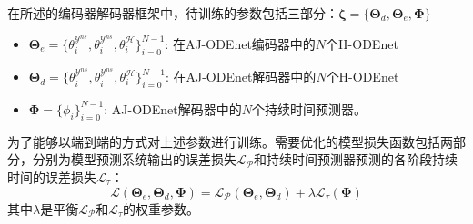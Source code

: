 在所述的编码器解码器框架中，待训练的参数包括三部分：$\boldsymbol \zeta=\{\boldsymbol{\Theta}_d, \boldsymbol{\Theta}_e,\boldsymbol{\Phi}\}$
\begin{itemize}
    \item $\boldsymbol{\Theta}_e=\{\theta_i^{\mathcal{Y}^{ns}},\theta_i^{\mathcal{Y}^{ns}},\theta_i^{\mathcal{H}}\}_{i=0}^{N-1}$: 在AJ-ODEnet编码器中的$N$个H-ODEnet 
    \item $\boldsymbol{\Theta}_d=\{\theta_i^{\mathcal{Y}^{ns}},\theta_i^{\mathcal{Y}^{ns}},\theta_i^{\mathcal{H}}\}_{i=0}^{N-1}$: 在AJ-ODEnet解码器中的$N$个H-ODEnet 
    \item $\boldsymbol{\Phi}=\{\phi_i\}_{i=0}^{N-1}$:  AJ-ODEnet解码器中的$N$个持续时间预测器。
\end{itemize}
为了能够以端到端的方式对上述参数进行训练。需要优化的模型损失函数包括两部分，分别为模型预测系统输出的误差损失$\mathcal{L_P}$和持续时间预测器预测的各阶段持续时间的误差损失$\mathcal{L_{\tau}}$：
\begin{equation}
\mathcal{L}(\boldsymbol{\Theta}_e, \boldsymbol{\Theta}_d, \boldsymbol \Phi) = \mathcal{L_P}(\boldsymbol{\Theta}_e, \boldsymbol{\Theta}_d) + \lambda\mathcal{L_{\tau}}(\boldsymbol \Phi)
\end{equation}
其中$\lambda$是平衡$\mathcal{L_P}$和$\mathcal{L_{\tau}}$的权重参数。

